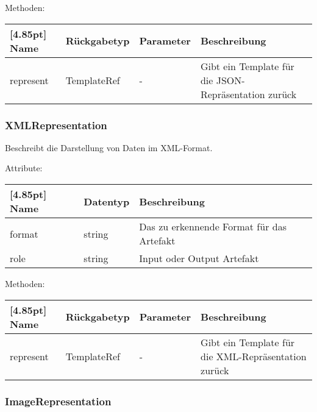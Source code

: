 				Methoden:
				\begin{center}
				\setlength\tabcolsep{5pt}
					\renewcommand{\arraystretch}{1.5}
						\begin{tabularx}{\textwidth}{|l|l|l|X|}
						\hline
						\rowcolor[gray]{0.75}[4.85pt]
						Name & Rückgabetyp & Parameter & Beschreibung \\ \hline
						represent & TemplateRef & - & Gibt ein Template für die JSON-Repräsentation zurück \\ \hline
						\end{tabularx}
				\end{center}
			
			\subsubsection{XMLRepresentation}
			
			Beschreibt die Darstellung von Daten im XML-Format.\newline
			
				Attribute:
				\begin{center}
					\renewcommand{\arraystretch}{1.5}
					\setlength\tabcolsep{5pt}
					\begin{tabularx}{\textwidth}{|l|l|X|}
						\hline
						\rowcolor[gray]{0.75}[4.85pt]					
						Name & Datentyp & Beschreibung \\ \hline
						format & string & Das zu erkennende Format für das Artefakt \\ \hline
						role & string & Input oder Output Artefakt \\ \hline
					\end{tabularx}
				\end{center}
				
				Methoden:
				\begin{center}
				\setlength\tabcolsep{5pt}
					\renewcommand{\arraystretch}{1.5}
						\begin{tabularx}{\textwidth}{|l|l|l|X|}
						\hline
						\rowcolor[gray]{0.75}[4.85pt]
						Name & Rückgabetyp & Parameter & Beschreibung \\ \hline
						represent & TemplateRef & - & Gibt ein Template für die XML-Repräsentation zurück \\ \hline
						\end{tabularx}
				\end{center}
			
			\subsubsection{ImageRepresentation}
			
